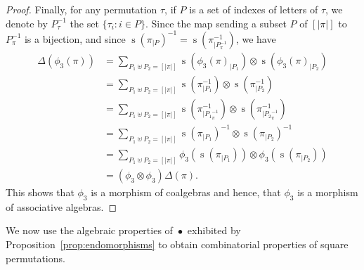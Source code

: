 \documentclass[a4paper,10pt]{llncs}
\DeclareMathOperator{\STD}{\mathrm{s}}
\DeclareMathOperator{\SHUFFLE}{\bullet}
\begin{document}
\begin{proof}
    Finally, for any permutation $\tau$, if $P$ is a set of indexes of
    letters of $\tau$, we denote by $P_\tau^{-1}$ the set
    $\{\tau_i : i \in P\}$. Since the map sending a subset $P$ of
    $[|\pi|]$ to $P_\pi^{-1}$ is a bijection, and since
    $\STD\left(\pi_{|P}\right)^{-1} = \STD\left(\pi^{-1}_{|P_\pi^{-1}}\right)$,
    we have
    \begin{equation} \begin{split}
        \Delta(\phi_3(\pi))
        & = \sum_{P_1 \uplus P_2 = [|\pi|]}
        \STD\left(\phi_3(\pi)_{|P_1}\right)
        \otimes \STD\left(\phi_3(\pi)_{|P_2}\right) \\
        & = \sum_{P_1 \uplus P_2 = [|\pi|]}
        \STD\left(\pi^{-1}_{|P_1}\right)
        \otimes \STD\left(\pi^{-1}_{|P_2}\right) \\
        & = \sum_{P_1 \uplus P_2 = [|\pi|]}
        \STD\left(\pi^{-1}_{|{P_1}_\pi^{-1}}\right)
        \otimes \STD\left(\pi^{-1}_{|{P_2}_\pi^{-1}}\right) \\
        & = \sum_{P_1 \uplus P_2 = [|\pi|]}
        \STD\left(\pi_{|P_1}\right)^{-1}
        \otimes \STD\left(\pi_{|P_2}\right)^{-1} \\
        & = \sum_{P_1 \uplus P_2 = [|\pi|]}
        \phi_3\left(\STD\left(\pi_{|P_1}\right)\right)
        \otimes \phi_3\left(\STD\left(\pi_{|P_2}\right)\right) \\
        & = (\phi_3 \otimes \phi_3) \Delta(\pi).
    \end{split} \end{equation}
    This shows that $\phi_3$ is a morphism of coalgebras and hence, that
    $\phi_3$ is a morphism of associative algebras.
\end{proof}
\medskip

We now use the algebraic properties of $\SHUFFLE$ exhibited by
Proposition~\ref{prop:endomorphisms} to obtain combinatorial properties
of square permutations.
\medskip
\end{document}
